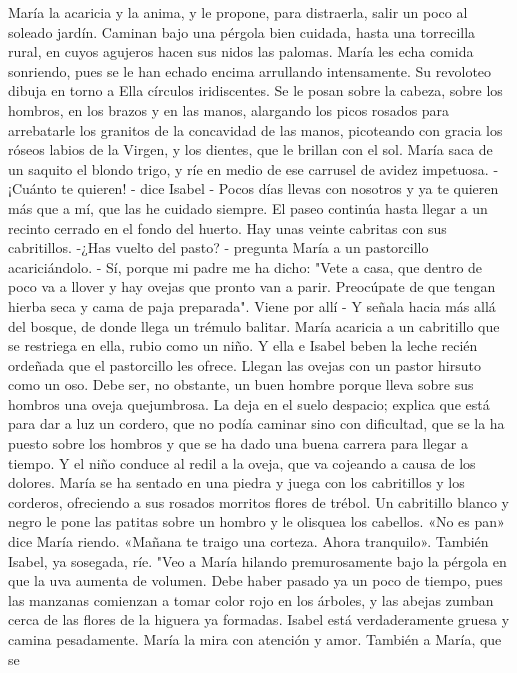 \documentclass[12pt]{book} %
\begin{document}
María la acaricia y la anima, y le propone, para distraerla, salir un poco al soleado jardín. 
Caminan bajo una pérgola bien cuidada, hasta una torrecilla rural, en cuyos agujeros hacen sus nidos las palomas. 
María les echa comida sonriendo, pues se le han echado encima arrullando intensamente. Su revoloteo dibuja en torno 
a Ella círculos iridiscentes. Se le posan sobre la cabeza, sobre los hombros, en los brazos y en las manos, alargando los picos rosados para arrebatarle los granitos de la concavidad de las manos, picoteando con gracia los róseos labios de la Virgen, y los dientes, que le brillan con el sol. María saca de un saquito el blondo trigo, y ríe en medio de ese carrusel de avidez impetuosa. 
-¡Cuánto te quieren! - dice Isabel - Pocos días llevas con nosotros y ya te quieren más que a mí, que las he cuidado siempre. 
El paseo continúa hasta llegar a un recinto cerrado en el fondo del huerto. Hay unas veinte cabritas con sus cabritillos. 
-¿Has vuelto del pasto? - pregunta María a un pastorcillo acariciándolo. 
- Sí, porque mi padre me ha dicho: "Vete a casa, que dentro de poco va a llover y hay ovejas que pronto van a parir. Preocúpate de que tengan hierba seca y cama de paja preparada". Viene por allí - Y señala hacia más allá del bosque, de donde llega un trémulo balitar. 
María acaricia a un cabritillo que se restriega en ella, rubio como un niño. Y ella e Isabel beben la leche recién ordeñada 
que el pastorcillo les ofrece. 
Llegan las ovejas con un pastor hirsuto como un oso. Debe ser, no obstante, un buen hombre porque lleva sobre sus 
hombros una oveja quejumbrosa. La deja en el suelo despacio; explica que está para dar a luz un cordero, que no podía caminar sino con dificultad, que se la ha puesto sobre los hombros y que se ha dado una buena carrera para llegar a tiempo. Y el niño conduce al redil a la oveja, que va cojeando a causa de los dolores. 
María se ha sentado en una piedra y juega con los cabritillos y los corderos, ofreciendo a sus rosados morritos flores de 
trébol. Un cabritillo blanco y negro le pone las patitas sobre un hombro y le olisquea los cabellos. «No es pan» dice María riendo. «Mañana te traigo una corteza. Ahora tranquilo». 
También Isabel, ya sosegada, ríe. 
"Veo a María hilando premurosamente bajo la pérgola en que la uva aumenta de volumen. Debe haber pasado ya un 
poco de tiempo, pues las manzanas comienzan a tomar color rojo en los árboles, y las abejas zumban cerca de las flores de la higuera ya formadas. 
Isabel está verdaderamente gruesa y camina pesadamente. María la mira con atención y amor. También a María, que se 
\end{document}
